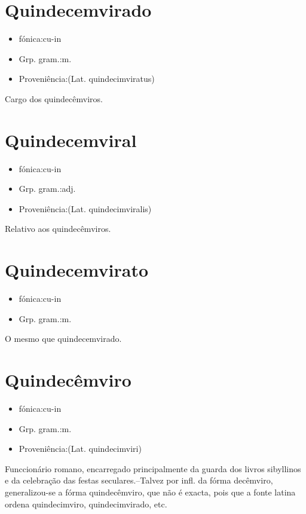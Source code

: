 \section{Quindecemvirado}
\begin{itemize}
\item {fónica:cu-in}
\end{itemize}
\begin{itemize}
\item {Grp. gram.:m.}
\end{itemize}
\begin{itemize}
\item {Proveniência:(Lat. \textunderscore quindecimviratus\textunderscore )}
\end{itemize}
Cargo dos quindecêmviros.
\section{Quindecemviral}
\begin{itemize}
\item {fónica:cu-in}
\end{itemize}
\begin{itemize}
\item {Grp. gram.:adj.}
\end{itemize}
\begin{itemize}
\item {Proveniência:(Lat. \textunderscore quindecimviralis\textunderscore )}
\end{itemize}
Relativo aos quindecêmviros.
\section{Quindecemvirato}
\begin{itemize}
\item {fónica:cu-in}
\end{itemize}
\begin{itemize}
\item {Grp. gram.:m.}
\end{itemize}
O mesmo que \textunderscore quindecemvirado\textunderscore .
\section{Quindecêmviro}
\begin{itemize}
\item {fónica:cu-in}
\end{itemize}
\begin{itemize}
\item {Grp. gram.:m.}
\end{itemize}
\begin{itemize}
\item {Proveniência:(Lat. \textunderscore quindecimviri\textunderscore )}
\end{itemize}
Funccionário romano, encarregado principalmente da guarda dos livros sibyllinos e da celebração das festas seculares.--Talvez por infl. da fórma \textunderscore decêmviro\textunderscore , generalizou-se a fórma \textunderscore quindecêmviro\textunderscore , que não é exacta, pois que a fonte latina ordena \textunderscore quindecimviro\textunderscore , \textunderscore quindecimvirado\textunderscore , etc.
